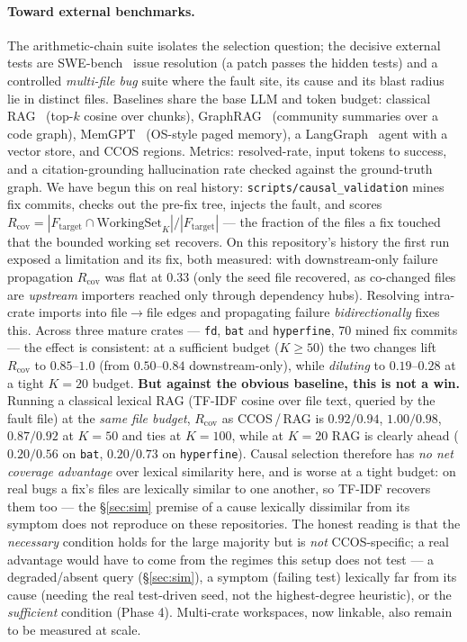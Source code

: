 \documentclass[11pt]{article}
\newcommand{\code}[1]{\texttt{#1}}
\begin{document}
\paragraph{Toward external benchmarks.} The arithmetic-chain suite isolates the
selection question; the decisive external tests are SWE-bench~\cite{jimenez2023swebench}
issue resolution (a patch passes the hidden tests) and a controlled
\emph{multi-file bug} suite where the fault site, its cause and its blast radius
lie in distinct files. Baselines share the base LLM and token budget: classical
RAG~\cite{lewis2020rag} (top-$k$ cosine over chunks), GraphRAG~\cite{edge2024graphrag}
(community summaries over a code graph), MemGPT~\cite{packer2023memgpt} (OS-style
paged memory), a LangGraph~\cite{langgraph} agent with a vector store, and CCOS
regions. Metrics: resolved-rate, input tokens to success, and a citation-grounding
hallucination rate checked against the ground-truth graph. We have begun this on
real history: \code{scripts/causal\_validation} mines fix commits, checks out the
pre-fix tree, injects the fault, and scores $R_{\mathrm{cov}} = |F_{\mathrm{target}}
\cap \mathrm{WorkingSet}_K| / |F_{\mathrm{target}}|$ --- the fraction of the files
a fix touched that the bounded working set recovers. On this repository's history
the first run exposed a limitation and its fix, both measured: with
downstream-only failure propagation $R_{\mathrm{cov}}$ was flat at $0.33$ (only the
seed file recovered, as co-changed files are \emph{upstream} importers reached
only through dependency hubs). Resolving intra-crate imports into file$\to$file
edges and propagating failure \emph{bidirectionally} fixes this. Across three
mature crates --- \code{fd}, \code{bat} and \code{hyperfine}, $70$ mined fix
commits --- the effect is consistent: at a sufficient budget ($K{\ge}50$) the two
changes lift $R_{\mathrm{cov}}$ to $0.85$--$1.0$ (from $0.50$--$0.84$
downstream-only), while \emph{diluting} to $0.19$--$0.28$ at a tight $K{=}20$
budget. \textbf{But against the obvious baseline, this is not a win.} Running a
classical lexical RAG (TF-IDF cosine over file text, queried by the fault file) at
the \emph{same file budget}, $R_{\mathrm{cov}}$ as CCOS\,/\,RAG is $0.92/0.94$,
$1.00/0.98$, $0.87/0.92$ at $K{=}50$ and ties at $K{=}100$, while at $K{=}20$ RAG
is clearly ahead ($0.20/0.56$ on \code{bat}, $0.20/0.73$ on \code{hyperfine}).
Causal selection therefore has \emph{no net coverage advantage} over lexical
similarity here, and is worse at a tight budget: on real bugs a fix's files are
lexically similar to one another, so TF-IDF recovers them too --- the §\ref{sec:sim}
premise of a cause lexically dissimilar from its symptom does not reproduce on
these repositories. The honest reading is that the \emph{necessary} condition
holds for the large majority but is \emph{not} CCOS-specific; a real advantage
would have to come from the regimes this setup does not test --- a degraded/absent
query (§\ref{sec:sim}), a symptom (failing test) lexically far from its cause
(needing the real test-driven seed, not the highest-degree heuristic), or the
\emph{sufficient} condition (Phase 4). Multi-crate workspaces, now linkable, also
remain to be measured at scale.
\end{document}
